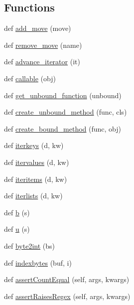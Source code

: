 \subsection*{Functions}
\begin{DoxyCompactItemize}
\item 
def \hyperlink{namespacesix_a4303f44d4650905d37134c8f3f5dd22d}{add\+\_\+move} (move)
\item 
def \hyperlink{namespacesix_a415a73f8f1dd244e895fb118878fb66d}{remove\+\_\+move} (name)
\item 
def \hyperlink{namespacesix_a7b01405579e397708fb9eaa258c3d35b}{advance\+\_\+iterator} (it)
\item 
def \hyperlink{namespacesix_a136c01fffede39c0dc0f4df67f57632f}{callable} (obj)
\item 
def \hyperlink{namespacesix_a7fdefd36b1e0348ef236a3b06cb104c0}{get\+\_\+unbound\+\_\+function} (unbound)
\item 
def \hyperlink{namespacesix_a803bd1806ed54b90ff035fcdca87ac6d}{create\+\_\+unbound\+\_\+method} (func, cls)
\item 
def \hyperlink{namespacesix_a84be7bb1ab8be3e70269a536e0625503}{create\+\_\+bound\+\_\+method} (func, obj)
\item 
def \hyperlink{namespacesix_a899a929d0fb30d96272a37df6709f0b0}{iterkeys} (d, kw)
\item 
def \hyperlink{namespacesix_a34ce02289f1999494da2b3274b465796}{itervalues} (d, kw)
\item 
def \hyperlink{namespacesix_a9577ea8bb177f2b6ad9abf0a289dcccd}{iteritems} (d, kw)
\item 
def \hyperlink{namespacesix_ac8538bbb01331110a586f0ace3ee9b74}{iterlists} (d, kw)
\item 
def \hyperlink{namespacesix_a6ba531a5f85f3825f47bbaaf01aa331e}{b} (s)
\item 
def \hyperlink{namespacesix_a4704ba0ec352ed62913e25fe339c4029}{u} (s)
\item 
def \hyperlink{namespacesix_ab6989579e9c8ed97ab707bc951f25dd2}{byte2int} (bs)
\item 
def \hyperlink{namespacesix_adc76be2a046073fafe57d52e5ec84775}{indexbytes} (buf, i)
\item 
def \hyperlink{namespacesix_afccd1dacf01a9aac1b3057dfd680d327}{assert\+Count\+Equal} (self, args, kwargs)
\item 
def \hyperlink{namespacesix_a031ebae754b5cae0b4fd56bd2932bd42}{assert\+Raises\+Regex} (self, args, kwargs)
\item 

\end{DoxyCompactItemize}
